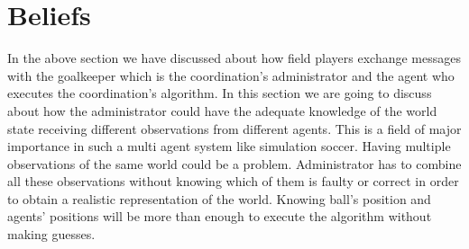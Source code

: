 \section{Beliefs}
In the above section we have discussed about how field players exchange messages with the goalkeeper which is the coordination's administrator and the agent who executes the coordination's algorithm. In this section we are going to discuss about how the administrator could have the adequate knowledge of the world state receiving different observations from different agents. This is a field of major importance in such a multi agent system like simulation soccer. Having multiple observations of the same world could be a problem. Administrator has to combine all these observations without knowing which of them is faulty or correct in order to obtain a realistic representation of the world. Knowing ball's position and agents' positions will be more than enough to execute the algorithm without making guesses.

